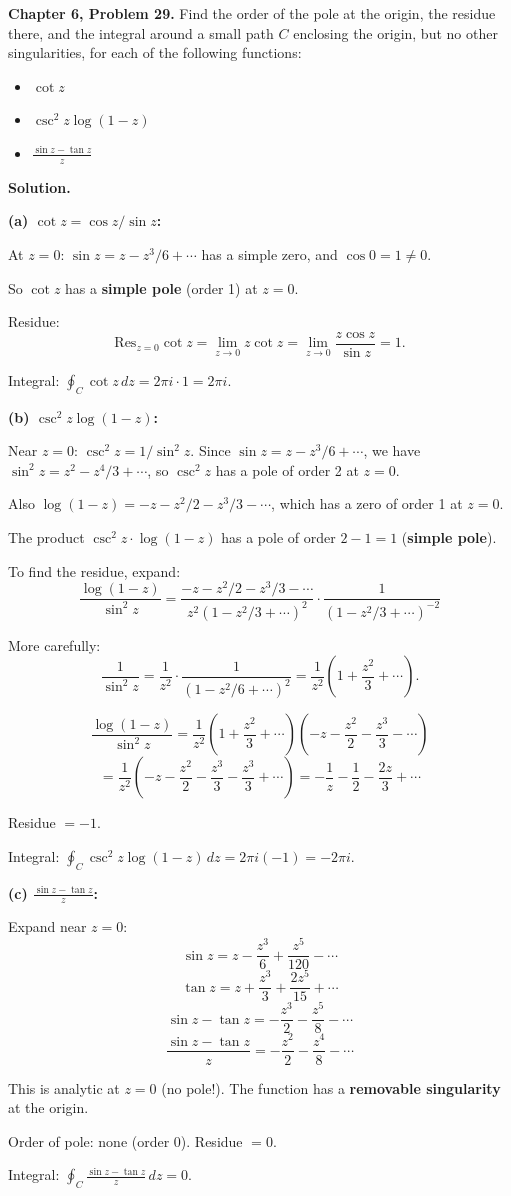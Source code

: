 \documentclass[12pt]{article}
\begin{document}
\textbf{Chapter 6, Problem 29.} Find the order of the pole at the origin, the residue there, and the integral around a small path $C$ enclosing the origin, but no other singularities, for each of the following functions:
\begin{itemize}
\item[(a)] $\cot z$
\item[(b)] $\csc^2 z \log(1-z)$
\item[(c)] $\displaystyle\frac{\sin z - \tan z}{z}$
\end{itemize}

\bigskip
\textbf{Solution.}

\textbf{(a) $\cot z = \cos z/\sin z$:}

At $z = 0$: $\sin z = z - z^3/6 + \cdots$ has a simple zero, and $\cos 0 = 1 \neq 0$.

So $\cot z$ has a \textbf{simple pole} (order 1) at $z = 0$.

Residue:
\[
\text{Res}_{z=0}\cot z = \lim_{z\to 0}z\cot z = \lim_{z\to 0}\frac{z\cos z}{\sin z} = 1.
\]

Integral: $\oint_C \cot z\,dz = 2\pi i \cdot 1 = \boxed{2\pi i}$.

\textbf{(b) $\csc^2 z\log(1-z)$:}

Near $z = 0$: $\csc^2 z = 1/\sin^2 z$. Since $\sin z = z - z^3/6 + \cdots$, we have $\sin^2 z = z^2 - z^4/3 + \cdots$, so $\csc^2 z$ has a pole of order 2 at $z=0$.

Also $\log(1-z) = -z - z^2/2 - z^3/3 - \cdots$, which has a zero of order 1 at $z = 0$.

The product $\csc^2 z \cdot \log(1-z)$ has a pole of order $2 - 1 = 1$ (\textbf{simple pole}).

To find the residue, expand:
\[
\frac{\log(1-z)}{\sin^2 z} = \frac{-z - z^2/2 - z^3/3 - \cdots}{z^2(1-z^2/3+\cdots)^2} \cdot \frac{1}{(1-z^2/3+\cdots)^{-2}}
\]

More carefully:
\[
\frac{1}{\sin^2 z} = \frac{1}{z^2}\cdot\frac{1}{(1-z^2/6+\cdots)^2} = \frac{1}{z^2}\left(1 + \frac{z^2}{3}+\cdots\right).
\]

\[
\frac{\log(1-z)}{\sin^2 z} = \frac{1}{z^2}\left(1+\frac{z^2}{3}+\cdots\right)\left(-z-\frac{z^2}{2}-\frac{z^3}{3}-\cdots\right)
\]
\[
= \frac{1}{z^2}\left(-z - \frac{z^2}{2} - \frac{z^3}{3} - \frac{z^3}{3} + \cdots\right) = -\frac{1}{z} - \frac{1}{2} - \frac{2z}{3} + \cdots
\]

Residue $= -1$.

Integral: $\oint_C \csc^2 z\log(1-z)\,dz = 2\pi i(-1) = \boxed{-2\pi i}$.

\textbf{(c) $\displaystyle\frac{\sin z - \tan z}{z}$:}

Expand near $z = 0$:
\[
\sin z = z - \frac{z^3}{6} + \frac{z^5}{120} - \cdots
\]
\[
\tan z = z + \frac{z^3}{3} + \frac{2z^5}{15} + \cdots
\]
\[
\sin z - \tan z = -\frac{z^3}{2} - \frac{z^5}{8} - \cdots
\]
\[
\frac{\sin z - \tan z}{z} = -\frac{z^2}{2} - \frac{z^4}{8} - \cdots
\]

This is analytic at $z = 0$ (no pole!). The function has a \textbf{removable singularity} at the origin.

Order of pole: none (order 0). Residue $= 0$.

Integral: $\oint_C \frac{\sin z - \tan z}{z}\,dz = \boxed{0}$.
\end{document}
